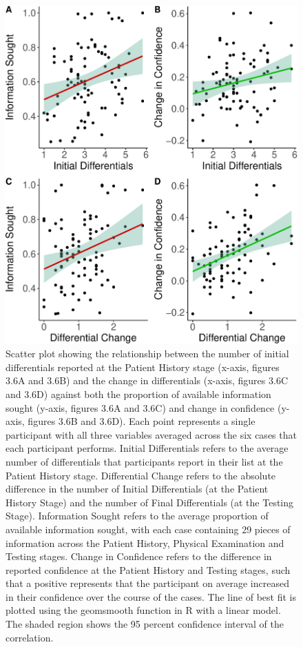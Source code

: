 \documentclass[a4paper, nobind]{templates/ociamthesis}
\begin{document}
\newpage

\begin{figure}[H]

{\centering \includegraphics[width=1\linewidth]{_main_files/figure-latex/diffsPlot-1} 

}

\caption[Online Study: Differentials Plotted Against Confidence/Accuracy (Scatter Plots)]{Scatter plot showing the relationship between the number of initial differentials reported at the Patient History stage (x-axis, figures 3.6A and 3.6B) and the change in differentials (x-axis, figures 3.6C and 3.6D) against both the proportion of available information sought (y-axis, figures 3.6A and 3.6C) and change in confidence (y-axis, figures 3.6B and 3.6D). Each point represents a single participant with all three variables averaged across the six cases that each participant performs. Initial Differentials refers to the average number of differentials that participants report in their list at the Patient History stage. Differential Change refers to the absolute difference in the number of Initial Differentials (at the Patient History Stage) and the number of Final Differentials (at the Testing Stage). Information Sought refers to the average proportion of available information sought, with each case containing 29 pieces of information across the Patient History, Physical Examination and Testing stages. Change in Confidence refers to the difference in reported confidence at the Patient History and Testing stages, such that a positive represents that the participant on average increased in their confidence over the course of the cases. The line of best fit is plotted using the geomsmooth function in R with a linear model. The shaded region shows the 95 percent confidence interval of the correlation.}\label{fig:diffsPlot}
\end{figure}
\end{document}
